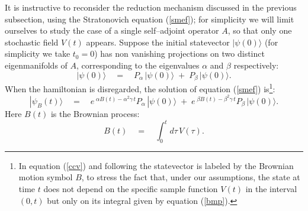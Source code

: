 \documentclass[12pt]{article}
\begin{document}
It is instructive to reconsider the reduction mechanism discussed
in the previous subsection, using the Stratonovich equation
(\ref{smef}); for simplicity we will limit ourselves to study the
case of a single self--adjoint operator $A$, so that only one
stochastic field $V(t)$ appears. Suppose the initial
statevector $|\psi(0)\rangle$ (for simplicity we take $t_{0} = 0$)
has non vanishing projections on two distinct eigenmanifolds of
$A$, corresponding to the eigenvalues $\alpha$ and $\beta$
respectively:
\begin{equation} \label{ispe}
|\psi(0)\rangle \quad = \quad P_{\alpha}\,|\psi(0)\rangle \; + \;
P_{\beta}\,|\psi(0)\rangle.
\end{equation}
When the hamiltonian is disregarded, the solution of equation
(\ref{smef}) is\footnote{In equation (\ref{ccv}) and following the
statevector is labeled by the Brownian motion symbol $B$, to
stress the fact that, under our assumptions, the state at time $t$
does not depend on the specific sample function $V(t)$ in the
interval $(0,t)$ but only on its integral given by equation
(\ref{bmp}).}:
\begin{equation} \label{ccv}
|\psi_{B}(t)\rangle \quad = \quad e^{\displaystyle \;\alpha B(t) -
\alpha^{2}\gamma\, t} P_{\alpha}\,|\psi(0)\rangle \; + \;
e^{\displaystyle \;\beta B(t) - \beta^{2}\gamma\, t}
P_{\beta}\,|\psi(0)\rangle.
\end{equation}
Here $B(t)$ is the Brownian process:
\begin{equation} \label{bmp}
B(t) \quad = \quad \int_{0}^{t} d\tau\, V(\tau).
\end{equation}
\end{document}
